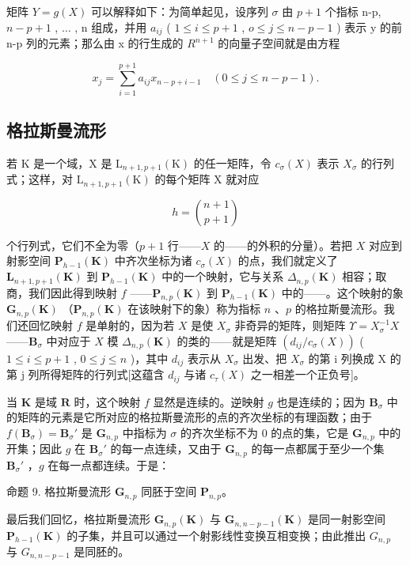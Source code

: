 矩阵 \(Y=g(X)\) 可以解释如下：为简单起见，设序列 \(\sigma\) 由 \(p+1\) 个指标 n-p, \(n-p+1\) , \(\ldots\) , n 组成，并用 \(a_{ij}\) ( \(1\leqslant i\leqslant p+1\) , \(o\leqslant j\leqslant n-p-1\) ) 表示 y 的前 n-p 列的元素；那么由 x 的行生成的 \(R^{n+1}\) 的向量子空间就是由方程

\[
x _ {j} = \sum_ {i = 1} ^ {p + 1} a _ {i j} x _ {n - p + i - 1} \quad (0 \leqslant j \leqslant n - p - 1).
\]

\subsection{格拉斯曼流形}

若 K 是一个域，X 是 \(\mathrm{L}_{n+1,p+1}(\mathrm{K})\) 的任一矩阵，令 \(c_{\sigma}(X)\) 表示 \(X_{\sigma}\) 的行列式；这样，对 \(\mathrm{L}_{n+1,p+1}(\mathrm{K})\) 的每个矩阵 X 就对应

\[
h = \binom {n + 1} {p + 1}
\]

个行列式，它们不全为零（\(p + 1\) 行——\(X\) 的——的外积的分量）。若把 \(X\) 对应到射影空间 \(\mathbf{P}_{h-1}(\mathbf{K})\) 中齐次坐标为诸 \(c_{\sigma}(X)\) 的点，我们就定义了 \(\mathbf{L}_{n+1,p+1}(\mathbf{K})\) 到 \(\mathbf{P}_{h-1}(\mathbf{K})\) 中的一个映射，它与关系 \(\Delta_{n,p}(\mathbf{K})\) 相容；取商，我们因此得到映射 \(f\) ——\(\mathbf{P}_{n,p}(\mathbf{K})\) 到 \(\mathbf{P}_{h-1}(\mathbf{K})\) 中的——。这个映射的象 \(\mathbf{G}_{n,p}(\mathbf{K})\) （\(\mathbf{P}_{n,p}(\mathbf{K})\) 在该映射下的象）称为指标 \(n\) 、\(p\) 的格拉斯曼流形。我们还回忆映射 \(f\) 是单射的，因为若 \(X\) 是使 \(X_{\sigma}\) 非奇异的矩阵，则矩阵 \(\Upsilon = X_{\sigma}^{-1}X\) ——\(\mathbf{B}_{\sigma}\) 中对应于 \(X\) 模 \(\Delta_{n,p}(\mathbf{K})\) 的类的——就是矩阵 \((d_{ij}/c_{\sigma}(X))\) ( \(1 \leqslant i \leqslant p + 1\) , \(0 \leqslant j \leqslant n\) )，其中 \(d_{ij}\) 表示从 \(X_{\sigma}\) 出发、把 \(X_{\sigma}\) 的第 i 列换成 X 的第 j 列所得矩阵的行列式{[}这蕴含 \(d_{ij}\) 与诸 \(c_{\tau}(X)\) 之一相差一个正负号{]}。

当 \(\mathbf{K}\) 是域 \(\mathbf{R}\) 时，这个映射 \(f\) 显然是连续的。逆映射 \(g\) 也是连续的；因为 \(\mathbf{B}_{\sigma}\) 中的矩阵的元素是它所对应的格拉斯曼流形的点的齐次坐标的有理函数；由于 \(f(\mathbf{B}_{\sigma}) = \mathbf{B}_{\sigma}'\) 是 \(\mathbf{G}_{n,p}\) 中指标为 \(\sigma\) 的齐次坐标不为 \(0\) 的点的集，它是 \(\mathbf{G}_{n,p}\) 中的开集；因此 \(g\) 在 \(\mathbf{B}_{\sigma}'\) 的每一点连续，又由于 \(\mathbf{G}_{n,p}\) 的每一点都属于至少一个集 \(\mathbf{B}_{\sigma}'\) ，\(g\) 在每一点都连续。于是：

命题 9. 格拉斯曼流形 \(\mathbf{G}_{n,p}\) 同胚于空间 \(\mathbf{P}_{n,p}\)。

最后我们回忆，格拉斯曼流形 \(\mathbf{G}_{n,p}(\mathbf{K})\) 与 \(\mathbf{G}_{n,n-p-1}(\mathbf{K})\) 是同一射影空间 \(\mathbf{P}_{h-1}(\mathbf{K})\) 的子集，并且可以通过一个射影线性变换互相变换；由此推出 \(G_{n,p}\) 与 \(G_{n,n-p-1}\) 是同胚的。
